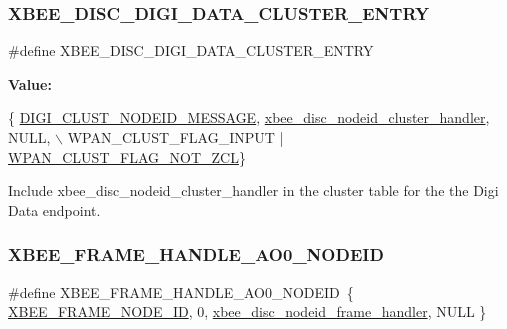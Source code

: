 \subsubsection{\texorpdfstring{X\+B\+E\+E\+\_\+\+D\+I\+S\+C\+\_\+\+D\+I\+G\+I\+\_\+\+D\+A\+T\+A\+\_\+\+C\+L\+U\+S\+T\+E\+R\+\_\+\+E\+N\+T\+RY}{XBEE\_DISC\_DIGI\_DATA\_CLUSTER\_ENTRY}}
{\footnotesize\ttfamily \#define X\+B\+E\+E\+\_\+\+D\+I\+S\+C\+\_\+\+D\+I\+G\+I\+\_\+\+D\+A\+T\+A\+\_\+\+C\+L\+U\+S\+T\+E\+R\+\_\+\+E\+N\+T\+RY}

{\bfseries Value\+:}
\begin{DoxyCode}
\{ \hyperlink{group__wpan__aps_gga1227ab13b41d82d9c9c9080662f74cf7ad19431fd18576cc8463e8ac362a8579c}{DIGI\_CLUST\_NODEID\_MESSAGE}, 
      \hyperlink{group__xbee__discovery_ga20bc82e8efc243e295c99c23948bed3b}{xbee\_disc\_nodeid\_cluster\_handler}, NULL, \(\backslash\)
      WPAN\_CLUST\_FLAG\_INPUT | \hyperlink{group__wpan__aps_gacb0e365a8c5e72ee90be503513e7e630}{WPAN\_CLUST\_FLAG\_NOT\_ZCL}\}
\end{DoxyCode}


Include xbee\+\_\+disc\+\_\+nodeid\+\_\+cluster\+\_\+handler in the cluster table for the the Digi Data endpoint. 

\mbox{\label{group__xbee__discovery_ga11002dcf6525c8a0d1144215bebbc774}} 
\subsubsection{\texorpdfstring{X\+B\+E\+E\+\_\+\+F\+R\+A\+M\+E\+\_\+\+H\+A\+N\+D\+L\+E\+\_\+\+A\+O0\+\_\+\+N\+O\+D\+E\+ID}{XBEE\_FRAME\_HANDLE\_AO0\_NODEID}}
{\footnotesize\ttfamily \#define X\+B\+E\+E\+\_\+\+F\+R\+A\+M\+E\+\_\+\+H\+A\+N\+D\+L\+E\+\_\+\+A\+O0\+\_\+\+N\+O\+D\+E\+ID~\{ \hyperlink{group__xbee__device_gga7753bbebaf00d6d64942f64b6ae9b7b9a5b572839c3123f1059ec2ced643cf5d2}{X\+B\+E\+E\+\_\+\+F\+R\+A\+M\+E\+\_\+\+N\+O\+D\+E\+\_\+\+ID}, 0, \hyperlink{group__xbee__discovery_gac15854e05ef3f80d6ddae653065c0a40}{xbee\+\_\+disc\+\_\+nodeid\+\_\+frame\+\_\+handler}, N\+U\+LL \}}



